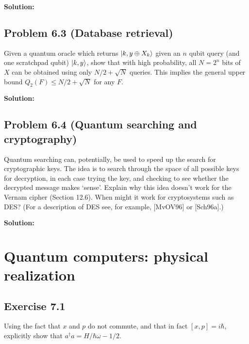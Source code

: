 \documentclass{book}
\begin{document}
        \textbf{Solution:}
    
    \section*{Problem 6.3 (Database retrieval)}
        Given a quantum oracle which returns $\ket{k,y\oplus X_k}$ given an $n$ qubit query (and one scratchpad qubit) $\ket{k,y}$, show that with high probability, all $N=2^n$ bits of $X$ can be obtained using only $N/2 + \sqrt{N}$ queries. This implies the general upper bound $Q_2(F) \leq N/2 +\sqrt{N}$ for any $F$.
        
        \textbf{Solution:}
    
    \section*{Problem 6.4 (Quantum searching and cryptography)}
        Quantum searching can, potentially, be used to speed up the search for cryptographic keys. The idea is to search through the space of all possible keys for decryption, in each case trying the key, and checking to see whether the decrypted message makes ‘sense’. Explain why this idea doesn’t work for the Vernam cipher (Section 12.6). When might it work for cryptosystems such as DES? (For a description of DES see, for example, [MvOV96] or [Sch96a].)
        
        \textbf{Solution:}

\chapter{Quantum computers: physical realization}

\section*{Exercise 7.1}
    Using the fact that $x$ and $p$ do not commute, and that in fact $[x,p]=i\hbar$, explicitly show that $a^\dagger a= H/\hbar\omega -1/2$.
    
\end{document}
